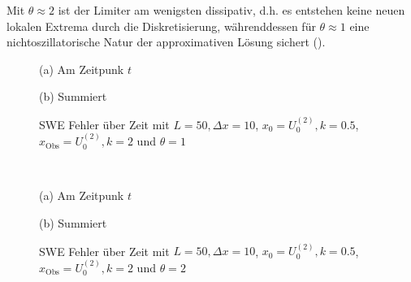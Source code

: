 Mit $\theta\approx 2$ ist der Limiter am wenigsten dissipativ, d.h. es entstehen keine neuen lokalen Extrema durch die Diskretisierung, währenddessen für $\theta\approx 1$ eine nichtoszillatorische Natur der approximativen Lösung sichert (\cite{kurganov2000new}).
\begin{figure}
\footnotesize
\begin{minipage}[b]{0.49\linewidth}
\centering

\caption*{(a) Am Zeitpunk $t$}
\end{minipage}
\begin{minipage}[b]{0.49\linewidth}
\centering

\caption*{(b) Summiert}
\end{minipage}
\caption{SWE Fehler über Zeit mit $L=50,\Delta x=10$, $x_0=U_0^{(2)},k=0.5$, $x_{\text{Obs}} = U_0^{(2)}, k=2$ und $\theta=1$}
\label{fig:sweConvergenceAdjoint}
% 
\quad\\[0.3cm]
\begin{minipage}[b]{0.49\linewidth}
\centering

\caption*{(a) Am Zeitpunk $t$}
\end{minipage}
\begin{minipage}[b]{0.49\linewidth}
\centering

\caption*{(b) Summiert}
\end{minipage}
\caption{SWE Fehler über Zeit mit $L=50,\Delta x=10$, $x_0=U_0^{(2)},k=0.5$, $x_{\text{Obs}} = U_0^{(2)}, k=2$ und $\theta=2$}
\label{fig:sweConvergenceAdjoint1}
\end{figure}


